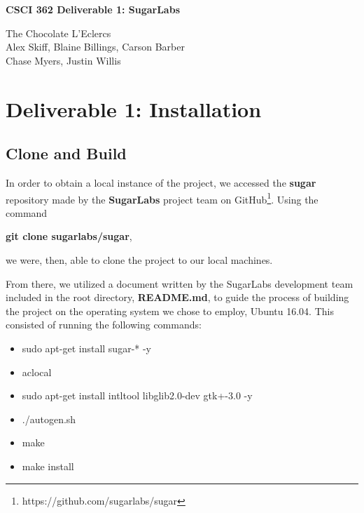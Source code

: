 \documentclass{article}
\begin{document}
\begin{center}
\textbf{CSCI 362 Deliverable 1: SugarLabs}
\end{center}


\begin{center}

{The Chocolate L'Eclercs}\\
\vspace{0.2cm}
{Alex Skiff, Blaine Billings, Carson Barber}\\
{Chase Myers, Justin Willis}\\
\vspace{0.2cm}

\end{center}



\begin{abstract}
\end{abstract}

\section{Deliverable 1: Installation}
\subsection{Clone and Build}
In order to obtain a local instance of the project, we accessed the \textbf{sugar} repository made by the \textbf{SugarLabs} project team on GitHub\footnote{https://github.com/sugarlabs/sugar}. Using the command 
\begin{center}
\textbf{git clone sugarlabs/sugar},
\end{center}
we were, then, able to clone the project to our local machines.

From there, we utilized a document written by the SugarLabs development team included in the root directory, \textbf{README.md}, to guide the process of building the project on the operating system we chose to employ, Ubuntu 16.04. This consisted of running the following commands:
\begin{itemize}
\itemsep-0.5em
\item[] sudo apt-get install sugar-* -y
\item[] aclocal
\item[] sudo apt-get install intltool libglib2.0-dev gtk+-3.0 -y
\item[] ./autogen.sh
\item[] make
\item[] make install
\end{itemize}
\end{document}
